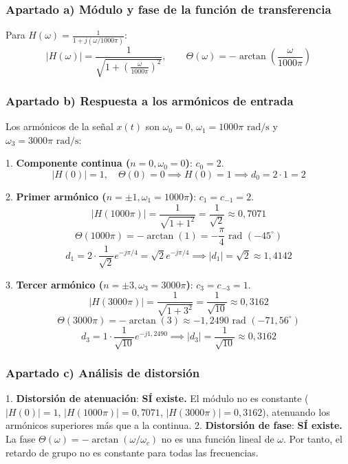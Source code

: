 \begin{resolucion}
\subsubsection*{Apartado a) Módulo y fase de la función de transferencia}

Para $H(\omega) = \frac{1}{1 + j (\omega / 1000\pi)}$:
\[
|H(\omega)| = \frac{1}{\sqrt{1 + \left(\frac{\omega}{1000\pi}\right)^2}}, \qquad \Theta(\omega) = -\arctan\left(\frac{\omega}{1000\pi}\right)
\]

\subsubsection*{Apartado b) Respuesta a los armónicos de entrada}

Los armónicos de la señal $x(t)$ son $\omega_0 = 0$, $\omega_1 = 1000\pi\text{ rad/s}$ y $\omega_3 = 3000\pi\text{ rad/s}$:

1. \textbf{Componente continua ($n = 0, \omega_0 = 0$)}:
   $c_0 = 2$.
   \[
   |H(0)| = 1, \quad \Theta(0) = 0 \implies H(0) = 1 \implies d_0 = 2 \cdot 1 = 2
   \]

2. \textbf{Primer armónico ($n = \pm 1, \omega_1 = 1000\pi$)}:
   $c_1 = c_{-1} = 2$.
   \[
   |H(1000\pi)| = \frac{1}{\sqrt{1 + 1^2}} = \frac{1}{\sqrt{2}} \approx 0{,}7071
   \]
   \[
   \Theta(1000\pi) = -\arctan(1) = -\frac{\pi}{4}\text{ rad } (-45^\circ)
   \]
   \[
   d_1 = 2 \cdot \frac{1}{\sqrt{2}} e^{-j\pi/4} = \sqrt{2} e^{-j\pi/4} \implies |d_1| = \sqrt{2} \approx 1{,}4142
   \]

3. \textbf{Tercer armónico ($n = \pm 3, \omega_3 = 3000\pi$)}:
   $c_3 = c_{-3} = 1$.
   \[
   |H(3000\pi)| = \frac{1}{\sqrt{1 + 3^2}} = \frac{1}{\sqrt{10}} \approx 0{,}3162
   \]
   \[
   \Theta(3000\pi) = -\arctan(3) \approx -1{,}2490\text{ rad } (-71{,}56^\circ)
   \]
   \[
   d_3 = 1 \cdot \frac{1}{\sqrt{10}} e^{-j 1{,}2490} \implies |d_3| = \frac{1}{\sqrt{10}} \approx 0{,}3162
   \]

\subsubsection*{Apartado c) Análisis de distorsión}

1. \textbf{Distorsión de atenuación}: \textbf{SÍ existe.} El módulo no es constante ($|H(0)| = 1$, $|H(1000\pi)| = 0{,}7071$, $|H(3000\pi)| = 0{,}3162$), atenuando los armónicos superiores más que a la continua.
2. \textbf{Distorsión de fase}: \textbf{SÍ existe.} La fase $\Theta(\omega) = -\arctan(\omega/\omega_c)$ no es una función lineal de $\omega$. Por tanto, el retardo de grupo no es constante para todas las frecuencias.


\end{resolucion}
